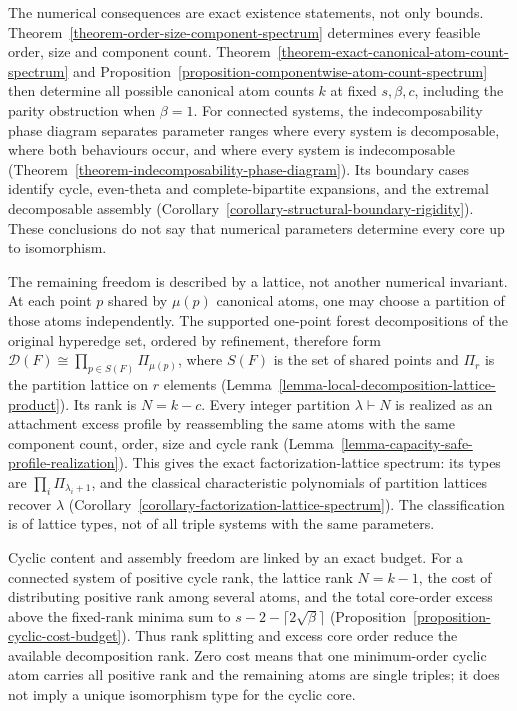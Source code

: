 \documentclass[a4paper,11pt,reqno]{amsart}
\theoremstyle{plain}
\theoremstyle{definition}
\theoremstyle{remark}
\begin{document}
The numerical consequences are exact existence statements, not only bounds.
Theorem~\ref{theorem-order-size-component-spectrum} determines every feasible
order, size and component count.
Theorem~\ref{theorem-exact-canonical-atom-count-spectrum} and
Proposition~\ref{proposition-componentwise-atom-count-spectrum} then determine
all possible canonical atom counts \(k\) at fixed \(s,\beta,c\), including
the parity obstruction when \(\beta=1\).  For connected systems, the
indecomposability phase diagram
separates parameter ranges where every system is decomposable, where both
behaviours occur, and where every system is indecomposable
(Theorem~\ref{theorem-indecomposability-phase-diagram}).  Its boundary cases
identify cycle, even-theta and complete-bipartite expansions, and the
extremal decomposable assembly
(Corollary~\ref{corollary-structural-boundary-rigidity}).  These conclusions
do not say that numerical parameters determine every core up to isomorphism.

The remaining freedom is described by a lattice, not another numerical
invariant.  At each point \(p\) shared by \(\mu(p)\) canonical atoms, one may
choose a partition of those atoms independently.  The supported one-point
forest decompositions of the original hyperedge set, ordered by refinement,
therefore form \(\mathcal D(F)\cong\prod_{p\in S(F)}\Pi_{\mu(p)}\), where
\(S(F)\) is the set of shared points and \(\Pi_r\) is the partition lattice
on \(r\) elements (Lemma~\ref{lemma-local-decomposition-lattice-product}).
Its rank is \(N=k-c\).  Every integer partition \(\lambda\vdash N\) is
realized as an attachment excess profile by reassembling the same atoms
with the same component count, order, size and cycle rank
(Lemma~\ref{lemma-capacity-safe-profile-realization}).  This gives the exact
factorization-lattice spectrum: its types are
\(\prod_i\Pi_{\lambda_i+1}\), and the classical characteristic polynomials
of partition lattices \citep[Chapter~3]{stanley2012} recover \(\lambda\)
(Corollary~\ref{corollary-factorization-lattice-spectrum}).  The classification
is of lattice types,
not of all triple systems with the same parameters.

Cyclic content and assembly freedom are linked by an exact budget.  For a
connected system of positive cycle rank, the lattice rank \(N=k-1\), the
cost of distributing positive rank among several atoms, and the total
core-order excess above the fixed-rank minima sum to
\(s-2-\lceil2\sqrt{\beta}\rceil\)
(Proposition~\ref{proposition-cyclic-cost-budget}).  Thus rank splitting
and excess core order reduce the available decomposition rank.  Zero cost
means that one minimum-order cyclic atom carries all positive rank and
the remaining atoms are single triples; it does not imply a unique
isomorphism type for the cyclic core.
\end{document}
